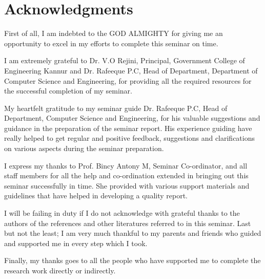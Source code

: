\chapter*{Acknowledgments}
First of all, I am indebted to the GOD ALMIGHTY for giving me an opportunity to excel in my efforts to complete this seminar on time.

I am extremely grateful to Dr. V.O Rejini, Principal, Government College of Engineering Kannur and Dr. Rafeeque P.C, Head of Department, Department of Computer Science and Engineering, for providing all the required resources for the successful completion of my seminar.

My heartfelt gratitude to my seminar guide Dr. Rafeeque P.C, Head of Department, Computer Science and Engineering, for his valuable suggestions and guidance in the preparation of the seminar report. His experience guiding have really helped to get regular and positive feedback, suggestions and clarifications on various aspects during the seminar preparation.

I express my thanks to Prof. Bincy Antony M, Seminar Co-ordinator, and all staff members for all the help and co-ordination extended in bringing out this seminar successfully in time. She provided with various support materials and guidelines that have helped in developing a quality report.

I will be failing in duty if I do not acknowledge with grateful thanks to the authors of the references and other literatures referred to in this seminar. Last but not the least; I am very much thankful to my parents and friends who guided and supported me in every step which I took.

Finally, my thanks goes to all the people who have supported me to complete the research work directly or indirectly.

\hfill \studentName